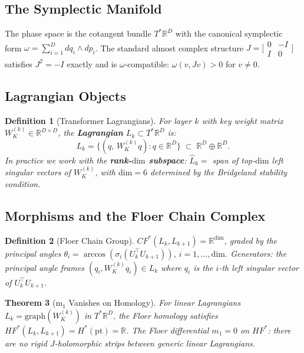 \documentclass[11pt]{amsart}
\newtheorem{theorem}{Theorem}[section]
\newtheorem{definition}[theorem]{Definition}
\begin{document}
\subsection{The Symplectic Manifold}

The phase space is the cotangent bundle $T^*\mathbb{R}^D$
with the canonical symplectic form $\omega = \sum_{i=1}^D dq_i \wedge dp_i$.
The standard almost complex structure $J = \bigl[\begin{smallmatrix}0&-I\\I&0\end{smallmatrix}\bigr]$
satisfies $J^2=-I$ exactly and is $\omega$-compatible:
$\omega(v,Jv)>0$ for $v\neq 0$.

\subsection{Lagrangian Objects}

\begin{definition}[Transformer Lagrangians]
For layer $k$ with key weight matrix $W_K^{(k)} \in \mathbb{R}^{D\times D}$,
the \textbf{Lagrangian} $L_k \subset T^*\mathbb{R}^D$ is:
\[
  L_k = \bigl\{(q,\, W_K^{(k)} q) : q \in \mathbb{R}^D\bigr\}
  \;\subset\; \mathbb{R}^D \oplus \mathbb{R}^D.
\]
In practice we work with the \textbf{rank-$\mathrm{dim}$ subspace}:
$\hat{L}_k = $ span of top-$\mathrm{dim}$ left singular vectors of $W_K^{(k)}$,
with $\mathrm{dim}=6$ determined by the Bridgeland stability condition.
\end{definition}

\subsection{Morphisms and the Floer Chain Complex}

\begin{definition}[Floer Chain Group]
$CF^{*}(L_k, L_{k+1}) = \mathbb{R}^{\mathrm{dim}}$, graded by the
principal angles $\theta_i = \arccos(\sigma_i(U_k^\top U_{k+1}))$,
$i=1,\ldots,\mathrm{dim}$.
Generators: the principal angle frames $(q_i, W_K^{(k)}q_i) \in L_k$
where $q_i$ is the $i$-th left singular vector of $U_k^\top U_{k+1}$.
\end{definition}

\begin{theorem}[m$_1$ Vanishes on Homology]
\label{thm:m1zero}
For linear Lagrangians $L_k = \mathrm{graph}(W_K^{(k)})$ in $T^*\mathbb{R}^D$,
the Floer homology satisfies
$HF^{*}(L_k, L_{k+1}) = H^*(\mathrm{pt}) = \mathbb{R}$.
The Floer differential $m_1 = 0$ on $HF^{*}$:
there are no rigid $J$-holomorphic strips between generic linear Lagrangians.
\end{theorem}
\end{document}
